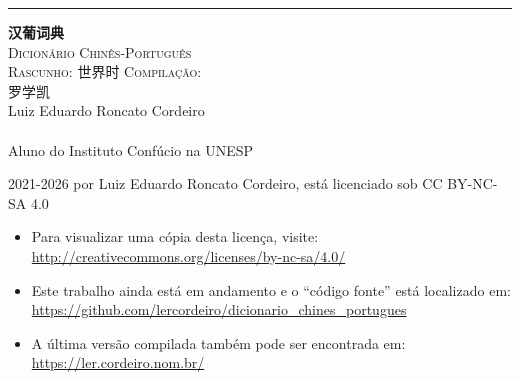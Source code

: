 
\begin{titlingpage}
  \raggedleft
  \rule{1pt}{\textheight}
  \hspace{0.1\textwidth}
  \parbox[b]{0.75\textwidth}{
    \vspace{0.05\textheight}
    {\HUGE\bfseries 汉葡词典}\\[2\baselineskip]%
    {\LARGE\textsc{Dicionário Chinês-Português}\\%
     \ifdraftdoc
     \large\textsc{Rascunho: \zhtoday \zhcurrtime 世界时}%
     \else
     \large\textsc{Compilação: \zhtoday}%
     \fi
    }\\[4\baselineskip]
    {\Large\textsc{罗学凯}\\%
     \small Luiz Eduardo Roncato Cordeiro}\\%
    \vspace{0.5\textheight}\\%
    {Aluno do Instituto Confúcio na UNESP}\\[\baselineskip]%
  }
  \newpage
  \raggedright
  \mbox{}
  \vfill
  \footnotesize
  \textcopyright{} 2021-2026 por Luiz Eduardo Roncato Cordeiro, está licenciado sob CC BY-NC-SA 4.0\\
  \begin{itemize}
    \item Para visualizar uma cópia desta licença, visite:\\ \url{http://creativecommons.org/licenses/by-nc-sa/4.0/}
    \item Este trabalho ainda está em andamento e o ``código fonte'' está localizado em:\\ \url{https://github.com/lercordeiro/dicionario_chines_portugues}
    \item A última versão compilada também pode ser encontrada em:\\ \url{https://ler.cordeiro.nom.br/}
  \end{itemize}
\end{titlingpage}

